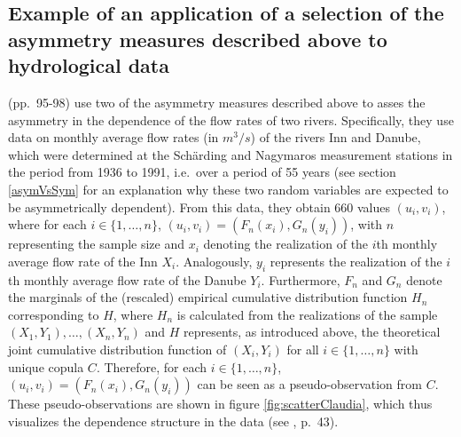 \documentclass[
]{krantz}
\begin{document}
\subsection{Example of an application of a selection of the asymmetry measures described above to hydrological data}\label{exAppl}

\citet{genest2013} (pp.~95-98) use two of the asymmetry measures described above to asses the asymmetry in the dependence of the flow rates of two rivers. Specifically, they use data on monthly average flow rates (in \(m^3/s\)) of the rivers Inn and Danube, which were determined at the Schärding and Nagymaros measurement stations in the period from 1936 to 1991, i.e.~over a period of 55 years (see section \ref{asymVsSym} for an explanation why these two random variables are expected to be asymmetrically dependent). From this data, they obtain 660 values \((u_i, v_i)\), where for each \(i \in \{1,\ldots, n\}\), \((u_i, v_i) = (F_n(x_i), G_n(y_i))\), with \(n\) representing the sample size and \(x_i\) denoting the realization of the \(i\)th monthly average flow rate of the Inn \(X_i\). Analogously, \(y_i\) represents the realization of the \(i\)th monthly average flow rate of the Danube \(Y_i\). Furthermore, \(F_n\) and \(G_n\) denote the marginals of the (rescaled) empirical cumulative distribution function \(H_n\) corresponding to \(H\), where \(H_n\) is calculated from the realizations of the sample \((X_1, Y_1),\ldots,(X_n, Y_n)\) and \(H\) represents, as introduced above, the theoretical joint cumulative distribution function of \((X_i, Y_i)\) for all \(i \in \{1,\ldots, n\}\) with unique copula \(C\). Therefore, for each \(i \in \{1,\ldots, n\}\), \((u_i, v_i) = (F_n(x_i), G_n(y_i))\) can be seen as a pseudo-observation from \(C\). These pseudo-observations are shown in figure \ref{fig:scatterClaudia}, which thus visualizes the dependence structure in the data (see \citet{durante2016}, p.~43).
\end{document}
